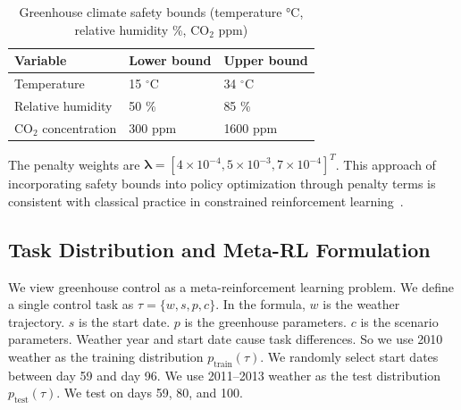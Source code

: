\documentclass[number,preprint,review,12pt]{elsarticle}
\begin{document}
\begin{table}[H]
\centering
\caption{Greenhouse climate safety bounds (temperature °C, relative humidity \%, CO$_2$ ppm)}
\label{tab:safe_ranges}
\begin{tabular}{lll}
\toprule
Variable & Lower bound & Upper bound \\
\midrule
Temperature & 15 $^\circ$C & 34 $^\circ$C \\
Relative humidity & 50 \% & 85 \% \\
CO$_2$ concentration & 300 ppm & 1600 ppm \\
\bottomrule
\end{tabular}
\end{table}

The penalty weights are $\boldsymbol{\lambda}=[4\times10^{-4}, 5\times10^{-3}, 7\times10^{-4}]^{T}$. This approach of incorporating safety bounds into policy optimization through penalty terms is consistent with classical practice in constrained reinforcement learning~\cite{achiam2017constrained,tessler2018reward,gu2024review}.

\subsection{Task Distribution and Meta-RL Formulation}
We view greenhouse control as a meta-reinforcement learning problem. We define a single control task as $\tau = \{w, s, p, c\}$. In the formula, $w$ is the weather trajectory. $s$ is the start date. $p$ is the greenhouse parameters. $c$ is the scenario parameters. Weather year and start date cause task differences. So we use 2010 weather as the training distribution $p_{\mathrm{train}}(\tau)$. We randomly select start dates between day 59 and day 96. We use 2011--2013 weather as the test distribution $p_{\mathrm{test}}(\tau)$. We test on days 59, 80, and 100.
\end{document}
